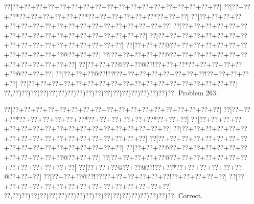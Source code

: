 \documentclass[a5paper]{article}
\begin{document}
\newpage
\begin{center}
{\goo
\0??[\0??+\0??+\0??+\0??+\0??+\0??+\0??+\0??+\0??+\0??+\0??+\0??+\0??+\0??+\0??+\0??+\0??+\0??]
\0??[\0??+\0??+\0??*\0??+\0??+\0??+\0??+\0??+\0??*\0??+\0??+\0??+\0??+\0??+\0??*\0??+\0??+\0??]
\0??[\0??+\0??+\0??+\0??+\0??+\0??+\0??+\0??+\0??+\0??+\0??+\0??+\0??+\0??+\0??+\0??+\0??+\0??]
\0??[\0??+\0??+\0??+\0??+\0??+\0??+\0??+\0??+\0??+\0??+\0??+\0??+\0??+\0??+\0??+\0??+\0??+\0??]
\0??[\0??+\0??+\0??+\0??+\0??+\0??+\0??+\0??+\0??+\0??+\0??+\0??+\0??+\0??+\0??+\0??+\0??+\0??]
\0??[\0??+\0??+\0??@\0??+\0??+\0??+\0??+\0??+\0??+\0??+\0??+\0??+\0??+\0??+\0??@\0??+\0??+\0??]
\0??[\0??+\0??+\0??+\0??+\0??@\0??+\0??+\0??+\0??+\0??+\0??+\0??+\0??+\0??+\0??+\0??+\0??+\0??]
\0??[\0??+\0??+\0??@\0??+\0??@\0??!\0??+\0??+\0??*\0??+\0??+\0??+\0??+\0??+\0??@\0??+\0??+\0??]
\0??[\0??+\0??+\0??@\0??!\0??!\0??+\0??+\0??+\0??+\0??+\0??+\0??+\0??!\0??+\0??+\0??+\0??+\0??]
\0??[\0??+\0??+\0??+\0??+\0??+\0??+\0??+\0??+\0??+\0??+\0??+\0??+\0??+\0??+\0??+\0??+\0??+\0??]
\0??,\0??)\0??)\0??)\0??)\0??)\0??)\0??)\0??)\0??)\0??)\0??)\0??)\0??)\0??)\0??)\0??)\0??)\0??.
}
Problem 263.

\end{center}
\begin{center}
{\goo
\0??[\0??+\0??+\0??+\0??+\0??+\0??+\0??+\0??+\0??+\0??+\0??+\0??+\0??+\0??+\0??+\0??+\0??+\0??]
\0??[\0??+\0??+\0??*\0??+\0??+\0??+\0??+\0??+\0??*\0??+\0??+\0??+\0??+\0??+\0??*\0??+\0??+\0??]
\0??[\0??+\0??+\0??+\0??+\0??+\0??+\0??+\0??+\0??+\0??+\0??+\0??+\0??+\0??+\0??+\0??+\0??+\0??]
\0??[\0??+\0??+\0??+\0??+\0??+\0??+\0??+\0??+\0??+\0??+\0??+\0??+\0??+\0??+\0??+\0??+\0??+\0??]
\0??[\0??+\0??+\0??+\0??+\0??+\0??+\0??+\0??+\0??+\0??+\0??+\0??+\0??+\0??+\0??+\0??+\0??+\0??]
\0??[\0??+\0??+\0??@\0??+\0??+\0??+\0??+\0??+\0??+\0??+\0??+\0??+\0??+\0??+\0??@\0??+\0??+\0??]
\0??[\0??+\0??+\0??+\0??+\0??@\0??+\0??+\0??+\0??+\0??+\0??+\0??+\0??+\0??+\0??+\0??+\0??+\0??]
\0??[\0??+\0??+\0??@\0??+\0??@\0??!\0??+\0??*\0??+\0??+\0??+\0??+\0??+\0??@\0??+\0??+\0??]
\0??[\0??+\0??+\0??@\0??!\0??!\0??+\0??+\0??+\0??+\0??+\0??!\0??+\0??+\0??+\0??+\0??]
\0??[\0??+\0??+\0??+\0??+\0??+\0??+\0??+\0??+\0??+\0??+\0??+\0??+\0??+\0??+\0??]
\0??,\0??)\0??)\0??)\0??)\0??)\0??)\0??)\0??)\0??)\0??)\0??)\0??)\0??)\0??)\0??)\0??)\0??)\0??.
}
Correct. 

\end{center}
\end{document}
